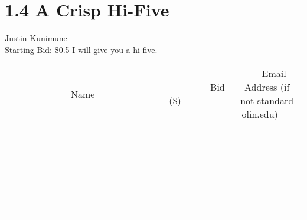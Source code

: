 \documentclass[11pt]{article}
\begin{document}
\section*{1.4 A Crisp Hi-Five}
Justin Kunimune
\\
Starting Bid: \$0.5
\newline
I will give you a hi-five.
\\[6ex]
\begin{tabular}{c c c}
~~~~~~~~~~~~~Name~~~~~~~~~~~~~ & ~~~~~~~~~Bid (\$)~~~~~~~~~  & ~~~Email Address (if not standard olin.edu)~~~\\
 & & \\
\hline
 & & \\
\hline
 & & \\
\hline
 & & \\
\hline
 & & \\
\hline
 & & \\
\hline
 & & \\
\hline
 & & \\
\hline
 & & \\
\hline
 & & \\
\hline
 & & \\
\hline
 & & \\
\hline
 & & \\
\hline
 & & \\
\hline
 & & \\
\hline
 & & \\
\hline
 & & \\
\hline
 & & \\
\hline
 & & \\
\hline
 & & \\
\hline
 & & \\
\hline
 & & \\
\hline
 & & \\
\hline
 & & \\
\hline
 & & \\
\hline
 & & \\
\hline
\end{tabular}
\newpage
\end{document}
